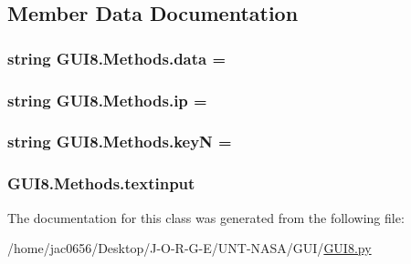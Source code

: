 \subsection{Member Data Documentation}
\subsubsection[{\texorpdfstring{data}{data}}]{\setlength{\rightskip}{0pt plus 5cm}string G\+U\+I8.\+Methods.\+data = \textquotesingle{}\textquotesingle{}\hspace{0.3cm}{\ttfamily [static]}}\hypertarget{classGUI8_1_1Methods_a0a8c1e1cc0921974506ee1e86e24af9b}{}\label{classGUI8_1_1Methods_a0a8c1e1cc0921974506ee1e86e24af9b}
\subsubsection[{\texorpdfstring{ip}{ip}}]{\setlength{\rightskip}{0pt plus 5cm}string G\+U\+I8.\+Methods.\+ip = \textquotesingle{}\textquotesingle{}\hspace{0.3cm}{\ttfamily [static]}}\hypertarget{classGUI8_1_1Methods_ac5aeb0c519d44173e630d3043630d6b5}{}\label{classGUI8_1_1Methods_ac5aeb0c519d44173e630d3043630d6b5}
\subsubsection[{\texorpdfstring{keyN}{keyN}}]{\setlength{\rightskip}{0pt plus 5cm}string G\+U\+I8.\+Methods.\+keyN = \textquotesingle{}\textquotesingle{}\hspace{0.3cm}{\ttfamily [static]}}\hypertarget{classGUI8_1_1Methods_a8525f729863e89dd50a9f74cdea594d7}{}\label{classGUI8_1_1Methods_a8525f729863e89dd50a9f74cdea594d7}
\subsubsection[{\texorpdfstring{textinput}{textinput}}]{\setlength{\rightskip}{0pt plus 5cm}G\+U\+I8.\+Methods.\+textinput}\hypertarget{classGUI8_1_1Methods_a2aa43992fb1cab1c4d8d542b047ee088}{}\label{classGUI8_1_1Methods_a2aa43992fb1cab1c4d8d542b047ee088}


The documentation for this class was generated from the following file\+:\begin{DoxyCompactItemize}
\item 
/home/jac0656/\+Desktop/\+J-\/\+O-\/\+R-\/\+G-\/\+E/\+U\+N\+T-\/\+N\+A\+S\+A/\+G\+U\+I/\hyperlink{GUI_2GUI8_8py}{G\+U\+I8.\+py}\end{DoxyCompactItemize}
